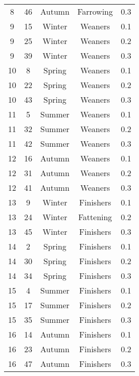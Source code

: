 \begin{table}[]
\begin{tabular}{ccccc}
8                   & 46     & Autumn & Farrowing & 0.3    \\
9                   & 15     & Winter & Weaners   & 0.1    \\
9                   & 25     & Winter & Weaners   & 0.2    \\
9                   & 39     & Winter & Weaners   & 0.3    \\
10                  & 8      & Spring & Weaners   & 0.1    \\
10                  & 22     & Spring & Weaners   & 0.2    \\
10                  & 43     & Spring & Weaners   & 0.3    \\
11                  & 5      & Summer & Weaners   & 0.1    \\
11                  & 32     & Summer & Weaners   & 0.2    \\
11                  & 42     & Summer & Weaners   & 0.3    \\
12                  & 16     & Autumn & Weaners   & 0.1    \\
12                  & 31     & Autumn & Weaners   & 0.2    \\
12                  & 41     & Autumn & Weaners   & 0.3    \\
13                  & 9      & Winter & Finishers & 0.1    \\
13                  & 24     & Winter & Fattening & 0.2    \\
13                  & 45     & Winter & Finishers & 0.3    \\
14                  & 2      & Spring & Finishers & 0.1    \\
14                  & 30     & Spring & Finishers & 0.2    \\
14                  & 34     & Spring & Finishers & 0.3    \\
15                  & 4      & Summer & Finishers & 0.1    \\
15                  & 17     & Summer & Finishers & 0.2    \\
15                  & 35     & Summer & Finishers & 0.3    \\
16                  & 14     & Autumn & Finishers & 0.1    \\
16                  & 23     & Autumn & Finishers & 0.2    \\
16                  & 47     & Autumn & Finishers & 0.3   
\end{tabular}
\end{table}